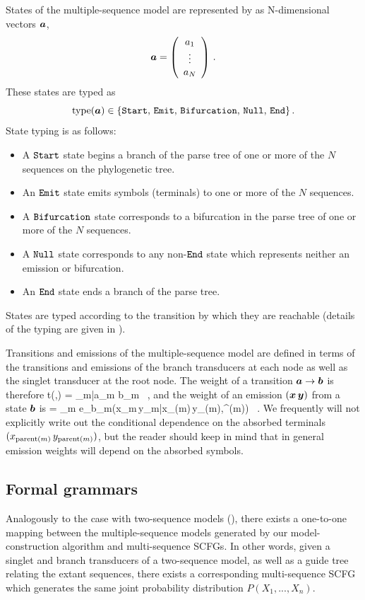 \documentclass[10pt]{article}
\begin{document}
States of the multiple-sequence model are represented by as N-dimensional vectors $\boldsymbol{a}$,
\[ \boldsymbol{a} = \left(\begin{array}{c}a_1\\\vdots\\a_N\end{array}\right) \, . \]
These states are typed as
\[ \operatorname{type}(\boldsymbol{a}) \in \lbrace\mathtt{Start},\,\mathtt{Emit},\,\mathtt{Bifurcation},\,\mathtt{Null},\,\mathtt{End}\rbrace \, . \]
State typing is as follows:
\begin{itemize}
  \item A $\mathtt{Start}$ state begins a branch of the parse tree of one or more of the $N$ sequences on the phylogenetic tree.
  \item An $\mathtt{Emit}$ state emits symbols (terminals) to one or more of the $N$ sequences.
  \item A $\mathtt{Bifurcation}$ state corresponds to a bifurcation in the parse tree of
    one or more of the $N$ sequences.
  \item A $\mathtt{Null}$ state corresponds to any non-$\mathtt{End}$ state which represents neither
    an emission or bifurcation.
  \item An $\mathtt{End}$ state ends a branch of the parse tree.
\end{itemize}
States are typed according to the transition by which they are reachable
(details of the typing are given in ).

Transitions and emissions of the multiple-sequence model are defined in terms of the transitions and emissions 
of the branch transducers at each node as well as the singlet transducer at the root node.
The weight of a transition $\boldsymbol{a} \to \boldsymbol{b}$ is therefore
\beqn
t(,) = \prod_{m|a_m \ne b_m}  \, ,
\eeqn
and the weight of an emission $(\boldsymbol{x}\,\boldsymbol{y})$ from a state $\boldsymbol{b}$ is
\beqn
{} = \prod_m e_{b_m}\left(x_m\,y_m|x_{\parent(m)}\,y_{\parent(m)},\theta^{(m)}\right) \, .
\eeqn
We frequently will not explicitly write out the conditional dependence on the absorbed terminals $(x_{\operatorname{parent}(m)}\,y_{\operatorname{parent}(m)})$,
but the reader should keep in mind that in general emission weights will depend on the absorbed symbols.

\subsection{Formal grammars} 

Analogously to the case with two-sequence models (),
there exists a one-to-one mapping between the multiple-sequence models generated by our model-construction algorithm 
and multi-sequence SCFGs.
In other words, given a singlet and branch transducers of a two-sequence model, as well
as a guide tree relating the extant sequences, there exists a corresponding multi-sequence SCFG
which generates the same joint probability distribution $P(X_1 , ... , X_n)$.
\end{document}
